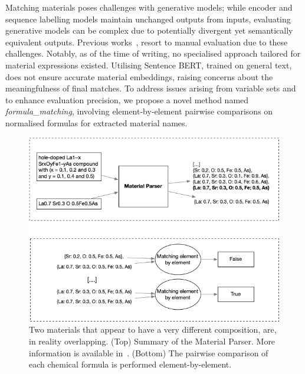 \documentclass[a4paper]{article}
\begin{document}
Matching materials poses challenges with generative models; while encoder and sequence labelling models maintain unchanged outputs from inputs, evaluating generative models can be complex due to potentially divergent yet semantically equivalent outputs. 
Previous works~\cite{taylor2022galactica}, resort to manual evaluation due to these challenges. Notably, as of the time of writing, no specialised approach tailored for material expressions existed. 
Utilising Sentence BERT, trained on general text, does not ensure accurate material embeddings, raising concerns about the meaningfulness of final matches. 
To address issues arising from variable sets and to enhance evaluation precision, we propose a novel method named \textit{formula\_matching}, involving element-by-element pairwise comparisons on normalised formulas for extracted material names.

\begin{figure}[ht]
  \centering
  \includegraphics[width=1\textwidth]{figures/formula-matching-schema.png} 
  \caption{Two materials that appear to have a very different composition, are, in reality overlapping. (Top) Summary of the Material Parser. More information is available in~\cite{lfoppiano2023automatic}. (Bottom) The pairwise comparison of each chemical formula is performed element-by-element.  }
  \label{fig:formula-matching-schema}
\end{figure}

\end{document}
